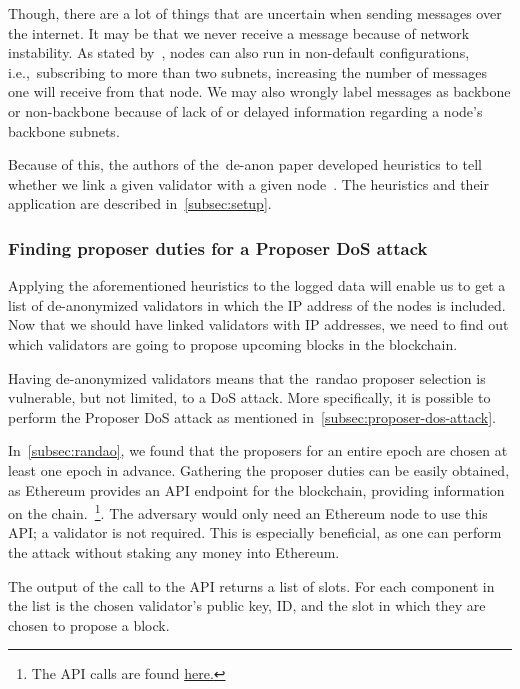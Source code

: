 Though, there are a lot of things that are uncertain when sending messages over the internet.
It may be that we never receive a message because of network instability.
As stated by~\cite{heimbach2024deanonymizingethereumvalidatorsp2p}, nodes can also run in non-default configurations,
i.e.,\ subscribing to more than two subnets, increasing the number of messages one will receive from that node.
We may also wrongly label messages as backbone or non-backbone because of lack of or delayed information regarding a node's backbone subnets.

Because of this,
the authors of the~\gls{de-anon paper} developed heuristics to tell whether we link a given validator with a given node~\cite{heimbach2024deanonymizingethereumvalidatorsp2p}.
The heuristics and their application are described in~\autoref{subsec:setup}.

\subsubsection{Finding proposer duties for a Proposer DoS attack}
Applying the aforementioned heuristics to the logged data will enable us to get a list of de-anonymized validators in which the IP address of the nodes is included.
Now that we should have linked validators with IP addresses, we need to find out which validators are going to propose upcoming blocks in the blockchain.

Having de-anonymized validators means that the~\gls{randao} proposer selection is vulnerable,
but not limited, to a DoS attack.
More specifically,
it is possible to perform the Proposer DoS attack as mentioned in~\autoref{subsec:proposer-dos-attack}.

In~\autoref{subsec:randao}, we found that the proposers for an entire epoch are chosen at least one epoch in advance.
Gathering the proposer duties can be easily obtained, as Ethereum provides an API endpoint for the blockchain,
providing information on the chain.~\footnote{The API calls are found \href{https://ethereum.github.io/beacon-APIs/\#/Validator/getProposerDuties}{here.}}.
The adversary would only need an Ethereum node to use this API; a validator is not required.
This is especially beneficial, as one can perform the attack without staking any money into Ethereum.

The output of the call to the API returns a list of slots.
For each component in the list is the chosen validator's public key,
ID, and the slot in which they are chosen to propose a block.

